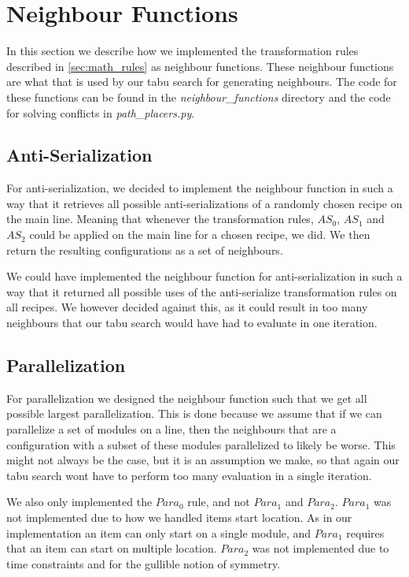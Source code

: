 \section{Neighbour Functions} 
In this section we describe how we implemented the transformation rules described in \cref{sec:math_rules} as neighbour functions. These neighbour functions are what that is used by our tabu search for generating neighbours. The code for these functions can be found in the \textit{neighbour\_functions} directory and the code for solving conflicts in \textit{path\_placers.py}.


\subsection{Anti-Serialization}
For anti-serialization, we decided to implement the neighbour function in such a way that it retrieves all possible anti-serializations of a randomly chosen recipe on the main line. Meaning that whenever the transformation rules, $AS_0$, $AS_1$ and $AS_2$ could be applied on the main line for a chosen recipe, we did. We then return the resulting configurations as a set of neighbours.

We could have implemented the neighbour function for anti-serialization in such a way that it returned all possible uses of the anti-serialize transformation rules on all recipes. We however decided against this, as it could result in too many neighbours that our tabu search would have had to evaluate in one iteration.


\subsection{Parallelization}
For parallelization we designed the neighbour function such that we get all possible largest parallelization. This is done because we assume that if we can parallelize a set of modules on a line, then the neighbours that are a configuration with a subset of these modules parallelized to likely be worse. This might not always be the case, but it is an assumption we make, so that again our tabu search wont have to perform too many evaluation in a single iteration. 

We also only implemented the $Para_0$ rule, and not $Para_1$ and $Para_2$. $Para_1$ was not implemented due to how we handled items start location. As in our implementation an item can only start on a single module, and $Para_1$ requires that an item can start on multiple location. $Para_2$ was not implemented due to time constraints and for the gullible notion of symmetry.



